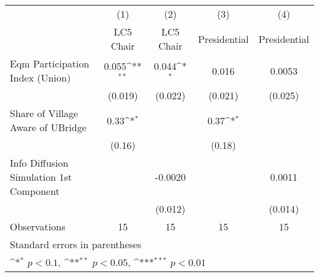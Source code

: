 {
\def\sym#1{\ifmmode^{#1}\else\(^{#1}\)\fi}
\begin{tabular}{l*{4}{c}}
\toprule
                &\multicolumn{1}{c}{(1)}&\multicolumn{1}{c}{(2)}&\multicolumn{1}{c}{(3)}&\multicolumn{1}{c}{(4)}\\
                &\multicolumn{1}{c}{LC5 Chair}&\multicolumn{1}{c}{LC5 Chair}&\multicolumn{1}{c}{Presidential}&\multicolumn{1}{c}{Presidential}\\
\midrule
Eqm Participation Index (Union)&    0.055\sym{**} &    0.044\sym{*}  &    0.016         &   0.0053         \\
                &  (0.019)         &  (0.022)         &  (0.021)         &  (0.025)         \\
Share of Village Aware of UBridge&     0.33\sym{*}  &                  &     0.37\sym{*}  &                  \\
                &   (0.16)         &                  &   (0.18)         &                  \\
Info Diffusion Simulation 1st Component&                  &  -0.0020         &                  &   0.0011         \\
                &                  &  (0.012)         &                  &  (0.014)         \\
\midrule
Observations    &       15         &       15         &       15         &       15         \\
\bottomrule
\multicolumn{5}{l}{\footnotesize Standard errors in parentheses}\\
\multicolumn{5}{l}{\footnotesize \sym{*} \(p<0.1\), \sym{**} \(p<0.05\), \sym{***} \(p<0.01\)}\\
\end{tabular}
}
